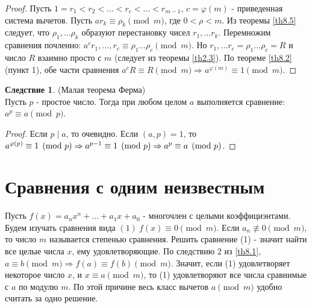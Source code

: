 \documentclass[a4paper, 12pt]{article}
\renewcommand{\phi}{\varphi}
\renewcommand{\div}{\mid}
\theoremstyle{definition}
\newtheorem*{consequense}{Следствие}
\begin{document}
    \begin{proof}
        Пусть $1=r_1<r_2<\dots<r_c<\dots<r_{m-1}$, $c=\phi(m)$ - приведенная система вычетов. Пусть $ar_k\equiv \rho_k \pmod{m}$, где $0<\rho<m$. Из теоремы \ref{th8.5} следует, что $\rho_1,\dots \rho_k$ образуют перестановку чисел $r_1,\dots r_k$. Перемножим сравнения почленно: $a^cr_1,\dots,r_c\equiv\rho_1\dots\rho_c \pmod{m}$. Но $r_1,\dots r_c=\rho_1\dots\rho_c=R$ и число $R$ взаимно просто с $m$ (следует из теоремы \ref{th2.3}). По теореме \ref{th8.2} (пункт 1), обе части сравнения $a^cR\equiv R\pmod{m}\Rightarrow a^{\phi(m)}\equiv 1\pmod{m}$.
    \end{proof} 
    \begin{consequense} (Малая теорема Ферма)\\
        Пусть $p$ - простое число. Тогда при любом целом $a$ выполняется сравнение: $a^p\equiv a\pmod{p}$.
    \end{consequense} 
    \begin{proof}
        Если $p\div a$, то очевидно. Если $(a,p)=1$, то $a^{\phi(p)}\equiv 1\pmod{p}\\
        \Rightarrow a^{p-1}\equiv 1\pmod{p}\Rightarrow a^p\equiv a\pmod{p}$.
    \end{proof}
    \newpage
    \section{Сравнения с одним неизвестным}
    Пусть $f(x)=a_nx^n+\dots+a_1x+a_0$ - многочлен с целыми коэффициэнтами. Будем изучать сравнения вида $(1)\ f(x)\equiv 0\pmod{m}$. Если $a_n\not\equiv 0\pmod{m}$, то число $m$ называется степенью сравнения. Решить сравнение (1) - значит найти все целые числа $x$, ему удовлетворяющие. По следствию 2 из \ref{th8.1},\ $a\equiv b\pmod{m}\Rightarrow f(a)\equiv f(b)\pmod{m}$. Значит, если (1) удовлетворяет некоторое число $x$, и $x\equiv a\pmod{m}$, то (1) удовлетворяют все числа сравнимые с $a$ по модулю $m$. По этой причине весь класс вычетов $a \pmod{m}$ удобно считать за одно решение.
\end{document}
